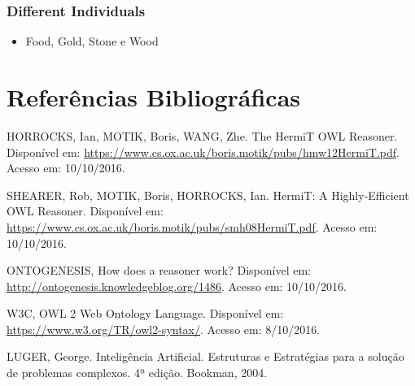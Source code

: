 \documentclass[10pt,a4paper]{article}
\begin{document}
\subsubsection{Different Individuals}

\begin{itemize}
    \item Food, Gold, Stone e Wood
\end{itemize}


\section{Referências Bibliográficas}

HORROCKS, Ian, MOTIK, Boris, WANG, Zhe. The HermiT OWL Reasoner. Disponível em: \url{https://www.cs.ox.ac.uk/boris.motik/pubs/hmw12HermiT.pdf}. Acesso em: 10/10/2016.

\vspace{5mm}

SHEARER, Rob, MOTIK, Boris, HORROCKS, Ian. HermiT: A Highly-Efficient OWL Reasoner. Disponível em: \url{https://www.cs.ox.ac.uk/boris.motik/pubs/smh08HermiT.pdf}. Acesso em: 10/10/2016.

\vspace{5mm}

ONTOGENESIS, How does a reasoner work? Disponível em: \url{http://ontogenesis.knowledgeblog.org/1486}. Acesso em: 10/10/2016.

\vspace{5mm}

W3C, OWL 2 Web Ontology Language. Disponível em: \url{https://www.w3.org/TR/owl2-syntax/}. Acesso em: 8/10/2016.

\vspace{5mm}

LUGER, George. Inteligência Artificial. Estruturas e Estratégias para a solução de problemas complexos. 4ª edição. Bookman, 2004.
\end{document}
